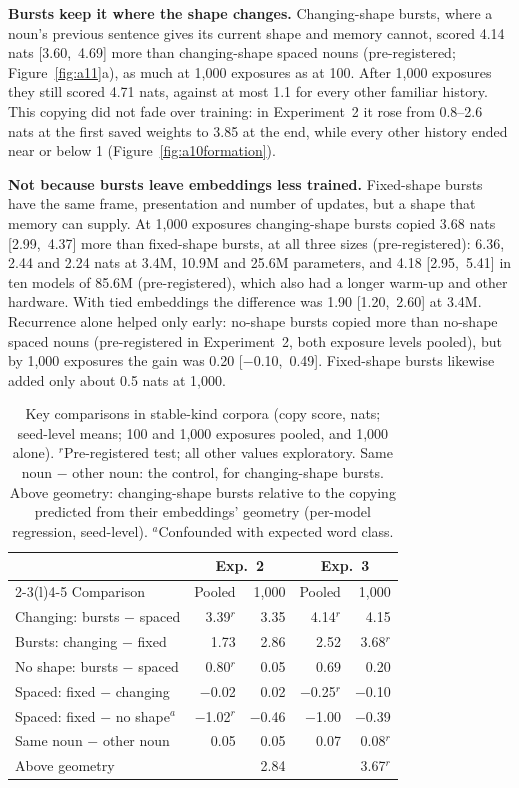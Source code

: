 \documentclass[11pt]{article}
\begin{document}
\textbf{Bursts keep it where the shape changes.} Changing-shape bursts, where a noun's previous sentence gives its current shape and memory cannot, scored 4.14 nats [3.60,~4.69] more than changing-shape spaced nouns (pre-registered; Figure~\ref{fig:a11}a), as much at 1,000 exposures as at 100. After 1,000 exposures they still scored 4.71 nats, against at most 1.1 for every other familiar history. This copying did not fade over training: in Experiment~2 it rose from 0.8--2.6 nats at the first saved weights to 3.85 at the end, while every other history ended near or below 1 (Figure~\ref{fig:a10formation}).

\textbf{Not because bursts leave embeddings less trained.} Fixed-shape bursts have the same frame, presentation and number of updates, but a shape that memory can supply. At 1,000 exposures changing-shape bursts copied 3.68 nats [2.99,~4.37] more than fixed-shape bursts, at all three sizes (pre-registered): 6.36, 2.44 and 2.24 nats at 3.4M, 10.9M and 25.6M parameters, and 4.18 [2.95,~5.41] in ten models of 85.6M (pre-registered), which also had a longer warm-up and other hardware. With tied embeddings the difference was 1.90 [1.20,~2.60] at 3.4M. Recurrence alone helped only early: no-shape bursts copied more than no-shape spaced nouns (pre-registered in Experiment~2, both exposure levels pooled), but by 1,000 exposures the gain was 0.20 [$-$0.10,~0.49]. Fixed-shape bursts likewise added only about 0.5 nats at 1,000.

\begin{table}[t]
\centering
\small
\setlength{\tabcolsep}{2.6pt}
\begin{tabular}{@{}lrrrr@{}}
\toprule
& \multicolumn{2}{c}{Exp.~2} & \multicolumn{2}{c}{Exp.~3} \\
\cmidrule(lr){2-3}\cmidrule(l){4-5}
Comparison & Pooled & 1,000 & Pooled & 1,000 \\
\midrule
Changing: bursts $-$ spaced & 3.39$^r$ & 3.35 & 4.14$^r$ & 4.15 \\
Bursts: changing $-$ fixed & 1.73 & 2.86 & 2.52 & 3.68$^r$ \\
No shape: bursts $-$ spaced & 0.80$^r$ & 0.05 & 0.69 & 0.20 \\
Spaced: fixed $-$ changing & $-$0.02 & 0.02 & $-$0.25$^r$ & $-$0.10 \\
Spaced: fixed $-$ no shape$^a$\! & $-$1.02$^r$ & $-$0.46 & $-$1.00 & $-$0.39 \\
Same noun $-$ other noun & 0.05 & 0.05 & 0.07 & 0.08$^r$ \\
Above geometry & & 2.84 & & 3.67$^r$ \\
\bottomrule
\end{tabular}
\caption{Key comparisons in stable-kind corpora (copy score, nats; seed-level means; 100 and 1,000 exposures pooled, and 1,000 alone). $^r$Pre-registered test; all other values exploratory. Same noun $-$ other noun: the control, for changing-shape bursts. Above geometry: changing-shape bursts relative to the copying predicted from their embeddings' geometry (per-model regression, seed-level). $^a$Confounded with expected word class.}
\label{tab:key}
\end{table}
\end{document}
